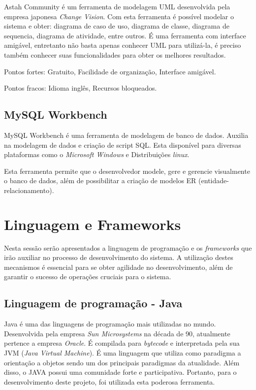 Astah Community \cite{astah} é um ferramenta de modelagem UML desenvolvida pela empresa japonesa \textit{Change Vision}. Com esta ferramenta é possível modelar o sistema e obter: diagrama de caso de uso, diagrama de classe, diagrama de sequencia, diagrama de atividade, entre outros. É uma ferramenta com interface amigável, entretanto  não basta apenas conhecer UML para utilizá-la, é preciso também conhecer suas funcionalidades para obter os melhores resultados. 

Pontos fortes: Gratuito, Facilidade de organização, Interface amigável.

Pontos fracos: Idioma inglês, Recursos bloqueados.


\subsection{MySQL Workbench}
MySQL Workbench \cite{mysql2018workbench} é uma ferramenta de modelagem de banco de dados. Auxilia na modelagem de dados e criação de script SQL. Esta disponível para diversas plataformas como o \textit{Microsoft Windows} e Distribuições \textit{linux}.

Esta ferramenta permite que o desenvolvedor modele, gere e gerencie visualmente o banco de dados, além de possibilitar a criação de modelos ER (entidade-relacionamento).

\section{Linguagem e Frameworks}
   Nesta sessão serão apresentados a linguagem de programação e os \textit{frameworks}  que irão auxiliar no processo de desenvolvimento do sistema. A utilização destes mecanismos é essencial para se obter agilidade no desenvolvimento, além de garantir o sucesso de operações cruciais para o sistema.
    
    \subsection{Linguagem de programação - Java}

Java é uma das linguagens de programação mais utilizadas no mundo. Desenvolvida pela empresa \textit{Sun Microsystems} na década de 90, atualmente pertence a empresa \textit{Oracle}.
É compilada para \textit{bytecode} e interpretada pela sua JVM (\textit{Java Virtual Machine}). É uma linguagem que utiliza como paradigma a orientação a objetos sendo um dos principais paradigmas da atualidade. Além disso, o JAVA possui uma comunidade forte e participativa.  Portanto, para o desenvolvimento deste projeto, foi utilizada esta poderosa ferramenta.


